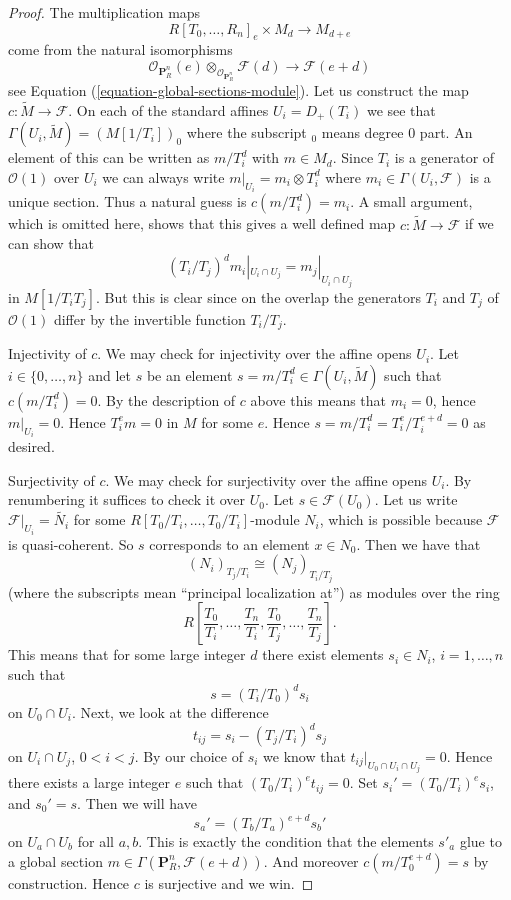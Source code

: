 \begin{proof}
The multiplication maps
$$
R[T_0, \ldots, R_n]_e \times M_d \longrightarrow M_{d + e}
$$
come from the natural isomorphisms
$$
\mathcal{O}_{\mathbf{P}^n_R}(e)
\otimes_{\mathcal{O}_{\mathbf{P}^n_R}}
\mathcal{F}(d)
\longrightarrow
\mathcal{F}(e + d)
$$
see Equation (\ref{equation-global-sections-module}). Let us construct the
map $c : \widetilde{M} \to \mathcal{F}$. On each of the standard affines
$U_i = D_{+}(T_i)$ we see that $\Gamma(U_i, \widetilde{M}) = (M[1/T_i])_0$
where the subscript ${}_0$ means degree $0$ part. An element of this
can be written as $m/T_i^d$ with $m \in M_d$. Since $T_i$ is a generator
of $\mathcal{O}(1)$ over $U_i$ we can always write
$m|_{U_i} = m_i \otimes T_i^d$ where $m_i \in \Gamma(U_i, \mathcal{F})$
is a unique section. Thus a natural guess is $c(m/T_i^d) = m_i$.
A small argument, which is omitted here, shows that this gives a
well defined map $c : \widetilde{M} \to \mathcal{F}$ if we can
show that
$$
(T_i/T_j)^d m_i|_{U_i \cap U_j} = m_j|_{U_i \cap U_j}
$$
in $M[1/T_iT_j]$.
But this is clear since on the overlap the generators $T_i$ and
$T_j$ of $\mathcal{O}(1)$ differ by the invertible function $T_i/T_j$.

\medskip\noindent
Injectivity of $c$. We may check for injectivity over the affine opens
$U_i$. Let $i \in \{0, \ldots, n\}$
and let $s$ be an element $s = m/T_i^d \in \Gamma(U_i, \widetilde{M})$
such that $c(m/T_i^d) = 0$. By the description of $c$ above this means that
$m_i = 0$, hence $m|_{U_i} = 0$. Hence $T_i^em = 0$ in $M$ for some
$e$. Hence $s = m/T_i^d = T_i^e/T_i^{e + d} = 0$ as desired.

\medskip\noindent
Surjectivity of $c$. We may check for surjectivity over the affine opens
$U_i$. By renumbering it suffices to check it over $U_0$.
Let $s \in \mathcal{F}(U_0)$.
Let us write $\mathcal{F}|_{U_i} = \widetilde{N_i}$ for some
$R[T_0/T_i, \ldots, T_0/T_i]$-module $N_i$, which is possible because
$\mathcal{F}$ is quasi-coherent. So $s$ corresponds to an element
$x \in N_0$. Then we have that
$$
(N_i)_{T_j/T_i} \cong (N_j)_{T_i/T_j}
$$
(where the subscripts mean ``principal localization at'')
as modules over the ring
$$
R\left[
\frac{T_0}{T_i}, \ldots, \frac{T_n}{T_i},
\frac{T_0}{T_j}, \ldots, \frac{T_n}{T_j}
\right].
$$
This means that for some large integer $d$ there exist elements
$s_i \in N_i$, $i = 1, \ldots, n$ such that
$$
s = (T_i/T_0)^d s_i
$$
on $U_0 \cap U_i$. Next, we look at the difference
$$
t_{ij} = s_i - (T_j/T_i)^d s_j
$$
on $U_i \cap U_j$, $0 < i < j$. By our choice of $s_i$ we know that
$t_{ij}|_{U_0 \cap U_i \cap U_j} = 0$. Hence there exists a large integer
$e$ such that $(T_0/T_i)^et_{ij} = 0$. Set $s_i' = (T_0/T_i)^es_i$,
and $s_0' = s$. Then we will have
$$
s_a' = (T_b/T_a)^{e + d} s_b'
$$
on $U_a \cap U_b$ for all $a, b$. This is exactly the condition that the
elements $s'_a$ glue to a global section
$m \in \Gamma(\mathbf{P}^n_R, \mathcal{F}(e + d))$.
And moreover $c(m/T_0^{e + d}) = s$ by construction. Hence $c$ is
surjective and we win.
\end{proof}


